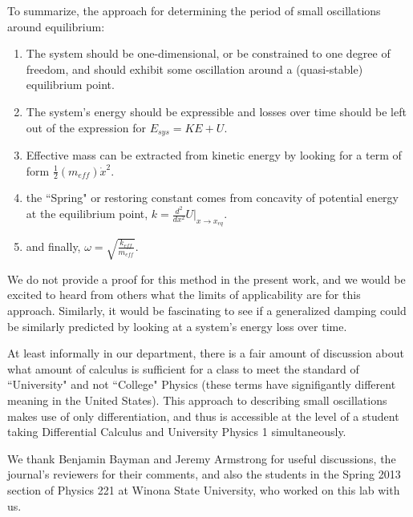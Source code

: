 \documentclass[12pt]{iopart}
\begin{document}
To summarize, the approach for determining the period of small oscillations around equilibrium:
\begin{enumerate}
\item The system should be one-dimensional, or be constrained to one degree of freedom, and should exhibit some oscillation around a (quasi-stable) equilibrium point.
\item The system's energy should be expressible and losses over time should be left out of the expression for 
$E_{sys}=KE+U$.
\item Effective mass can be extracted from kinetic energy by looking for a term of form 
$\frac{1}{2}\left(m_{eff}\right) \dot{x}^2$.
\item the ``Spring" or restoring constant comes from concavity of potential energy at the equilibrium point, 
$k=\frac{d^2}{dx^2}U|_{x\to x_{eq}}$.
\item and finally, $\omega=\sqrt{\frac{k_{eff}}{m_{eff}}}$.
\end{enumerate}

We do not provide a proof for this method in the present work, and we would be excited to heard from others what the limits of applicability are for this approach.  Similarly, it would be fascinating to see if a generalized  damping could be similarly predicted by looking at a system's energy loss over time.   

At least informally in our department, there is a fair amount of discussion about what amount of calculus is sufficient for a class to meet the standard of ``University" and not ``College" Physics (these terms have signifigantly different meaning in the United States).  This approach to describing small oscillations makes use of only differentiation, and thus is accessible at the level of a student taking Differential Calculus and University Physics 1 simultaneously. 

We thank Benjamin Bayman and Jeremy Armstrong for useful discussions, the journal's reviewers for their comments, and also the students in the Spring 2013 section of Physics 221 at Winona State University, who worked on this lab with us.
\end{document}

